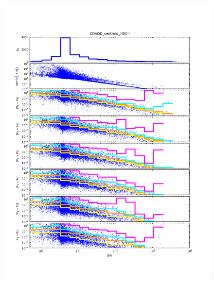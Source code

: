 \begin{figure}[t]
\centering
    \begin{minipage}{.49\textwidth}
        \centering
        \includegraphics[width=1.0\textwidth]{figure/plot_coadd_centroid_HSC-I.png}
    \end{minipage}
    \begin{minipage}{.49\textwidth}
        \centering

\end{minipage}
\end{figure}

